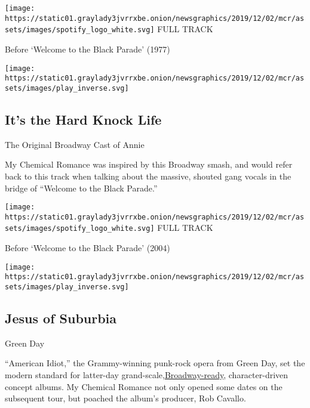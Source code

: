 \href{https://open.spotify.com/track/7tFiyTwD0nx5a1eklYtX2J?si=4xbhkoJFRoemna3mJajWyA}{}

\texttt{[image: https://static01.graylady3jvrrxbe.onion/newsgraphics/2019/12/02/mcr/assets/images/spotify\_logo\_white.svg]}
FULL TRACK

Before `Welcome to the Black Parade' (1977)

\texttt{[image: https://static01.graylady3jvrrxbe.onion/newsgraphics/2019/12/02/mcr/assets/images/play\_inverse.svg]}

\hypertarget{its-the-hard-knock-life}{%
\subsection{It's the Hard Knock Life}\label{its-the-hard-knock-life}}

The Original Broadway Cast of Annie

My Chemical Romance was inspired by this Broadway smash, and would refer
back to this track when talking about the massive, shouted gang vocals
in the bridge of ``Welcome to the Black Parade.''

\href{https://open.spotify.com/track/2IetGxzkjAYQsoFtvX0fNA?si=f91k4GyrQGqBLxwrK6Ivwg}{}

\texttt{[image: https://static01.graylady3jvrrxbe.onion/newsgraphics/2019/12/02/mcr/assets/images/spotify\_logo\_white.svg]}
FULL TRACK

Before `Welcome to the Black Parade' (2004)

\texttt{[image: https://static01.graylady3jvrrxbe.onion/newsgraphics/2019/12/02/mcr/assets/images/play\_inverse.svg]}

\hypertarget{jesus-of-suburbia}{%
\subsection{Jesus of Suburbia}\label{jesus-of-suburbia}}

Green Day

``American Idiot,'' the Grammy-winning punk-rock opera from Green Day,
set the modern standard for latter-day
grand-scale,\href{https://www.nytimes3xbfgragh.onion/2010/04/21/theater/reviews/21idiot.html}{}\href{https://www.nytimes3xbfgragh.onion/2010/04/21/theater/reviews/21idiot.html}{Broadway-ready},
character-driven concept albums. My Chemical Romance not only opened
some dates on the subsequent tour, but poached the album's producer, Rob
Cavallo.

\href{https://open.spotify.com/track/58KPPL1AdLHMvR2O2PZejr?si=eZPJJ5bqSKCifTTxykup7w}{}

